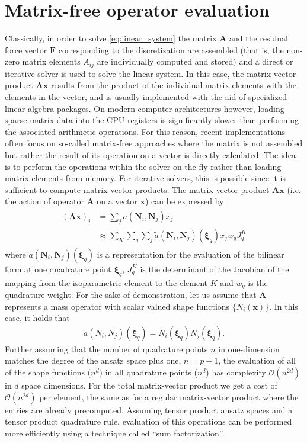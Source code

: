 \documentclass[AMA,STIX1COL]{WileyNJD-v2}
\newcommand*{\gz}[1]{\boldsymbol{#1}}
\begin{document}
\section{Matrix-free operator evaluation}
\label{sec:mf}
Classically, in order to solve \eqref{eq:linear_system} the matrix $\gz A$ and the residual force vector $\gz F$ corresponding to the discretization are assembled (that is, the non-zero matrix elements $A_{ij}$ are individually computed and stored) and a direct or iterative solver is used to solve the linear system.
In this case, the matrix-vector product $\gz A \gz x$ results from the product of the individual matrix elements with the elements in the vector, and is usually implemented with the aid of specialized linear algebra packages.
On modern computer architectures however, loading sparse matrix data into the CPU registers is significantly slower than performing the associated arithmetic operations.
For this reason, recent implementations often focus on so-called matrix-free approaches \cite{kronbichler12, kronbichler2017fast} where the matrix is not assembled but rather the result of its operation on a vector is directly calculated.
The idea is to perform the operations within the solver on-the-fly rather than loading matrix elements from memory.
For iterative solvers, this is possible since it is sufficient to compute matrix-vector products.
%
The matrix-vector product $\gz A \gz x$ (i.e. the action of operator $\gz A$ on a vector $\gz x$) can be expressed by
\begin{align}
  \begin{split}
 (\gz A \gz x)_i &= \sum_j a(\gz N_i,\gz N_j) x_j \\
        &\approx \sum_K \sum_q \sum_j \tilde{a}(\gz N_i,\gz N_j)(\gz \xi_q) x_j w_q J^K_q
  \end{split}
  \label{eq:mf_vmult}
\end{align}
where $\tilde{a}(\gz N_i,\gz N_j)(\gz \xi_q)$ is a representation for the evaluation of the bilinear form at one quadrature point $\gz \xi_q$, $J^K_q$ is the {\color{red}determinant of the} Jacobian of the mapping from the isoparametric element to the element $K$ and
$w_q$ is the quadrature weight.
For the sake of demonstration, let us assume that $\gz A$ represents a mass operator with scalar valued shape functions $\{ N_i(\gz x) \}$. In this case, it holds that
\begin{align*}
 \tilde{a}(N_i,N_j)(\gz \xi_q) = N_i(\gz \xi_q)N_j(\gz \xi_q).
\end{align*}
Further assuming that the number of quadrature points $n$ in one-dimension matches the degree of the ansatz space plus one{\color{red}, $n=p+1$}, the evaluation of all of the shape functions ($n^d$)
in all quadrature points ($n^d$) has complexity $\mathcal{O}(n^{2d})$ in $d$ space dimensions.
For the total matrix-vector product we get a cost of $\mathcal{O}(n^{2d})$ per element,
the same as for a regular matrix-vector product where the entries are already precomputed. Assuming tensor product ansatz spaces and a tensor product quadrature rule, evaluation of this operations can be performed more efficiently using a technique called ``sum factorization''.
\end{document}
